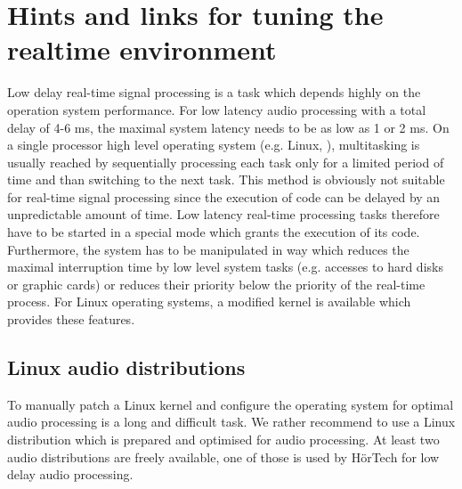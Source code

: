 
\section{Hints and links for tuning the realtime environment}%
\label{sec:system}%

Low delay real-time signal processing is a task which depends highly on
the operation system performance. For low latency audio processing
with a total delay of 4-6 ms, the maximal system latency needs to be
as low as 1 or 2 ms.  On a single processor high level operating
system (e.g. Linux, \Windows{}), multitasking is usually reached by
sequentially processing each task only for a limited period of time
and than switching to the next task. This method is obviously not
suitable for real-time signal processing since the execution of code
can be delayed by an unpredictable amount of time. Low latency
real-time processing tasks therefore have to be started in a special
mode which grants the execution of its code. Furthermore, the system
has to be manipulated in way which reduces the maximal interruption
time by low level system tasks (e.g. accesses to hard disks or graphic
cards) or reduces their priority below the priority of the real-time
process. For Linux operating systems, a modified kernel is available
which provides these features.

\subsection{Linux audio distributions}

To manually patch a Linux kernel and configure the operating system
for optimal audio processing is a long and difficult task. We rather
recommend to use a Linux distribution which is prepared and optimised
for audio processing. At least two audio distributions are freely
available, one of those is used by H\"orTech for low delay audio
processing.

